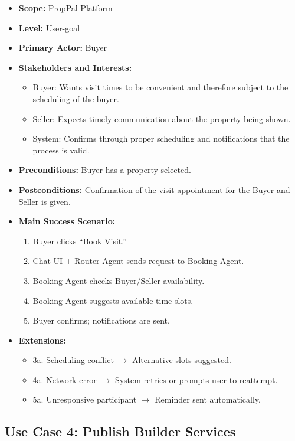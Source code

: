 \begin{itemize}
    \item \textbf{Scope:} PropPal Platform
    \item \textbf{Level:} User-goal
    \item \textbf{Primary Actor:} Buyer
    \item \textbf{Stakeholders and Interests:}
    \begin{itemize}
        \item Buyer: Wants visit times to be convenient and therefore subject to the scheduling of the buyer.
        \item Seller: Expects timely communication about the property being shown.
        \item System: Confirms through proper scheduling and notifications that the process is valid.
    \end{itemize}
    \item \textbf{Preconditions:} Buyer has a property selected.
    \item \textbf{Postconditions:} Confirmation of the visit appointment for the Buyer and Seller is given.
    \item \textbf{Main Success Scenario:}
    \begin{enumerate}
        \item Buyer clicks ``Book Visit.''
        \item Chat UI + Router Agent sends request to Booking Agent.
        \item Booking Agent checks Buyer/Seller availability.
        \item Booking Agent suggests available time slots.
        \item Buyer confirms; notifications are sent.
    \end{enumerate}
    \item \textbf{Extensions:}
    \begin{itemize}
        \item 3a. Scheduling conflict $\rightarrow$ Alternative slots suggested.
        \item 4a. Network error $\rightarrow$ System retries or prompts user to reattempt.
        \item 5a. Unresponsive participant $\rightarrow$ Reminder sent automatically.
    \end{itemize}
\end{itemize}

\subsection{Use Case 4: Publish Builder Services}

